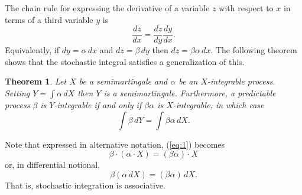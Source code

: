 \documentclass[12pt]{article}
\newtheorem*{theorem*}{Theorem}
\begin{document}

The chain rule for expressing the derivative of a variable $z$ with respect to $x$ in terms of a third variable $y$ is
\begin{equation*}
\frac{dz}{dx}=\frac{dz}{dy}\frac{dy}{dx}.
\end{equation*}
Equivalently, if $dy=\alpha\,dx$ and $dz=\beta\,dy$ then $dz=\beta\alpha\,dx$.
The following theorem shows that the stochastic integral satisfies a generalization of this.

\begin{theorem*}
Let $X$ be a semimartingale and $\alpha$ be an $X$-integrable process. Setting $Y=\int\alpha\,dX$ then $Y$ is a semimartingale. Furthermore, a predictable process $\beta$ is $Y$-integrable if and only if $\beta\alpha$ is $X$-integrable, in which case
\begin{equation}\label{eq:1}
\int\beta\,dY=\int\beta\alpha\,dX.
\end{equation}
\end{theorem*}
Note that expressed in alternative notation, (\ref{eq:1}) becomes
\begin{equation*}
\beta\cdot(\alpha\cdot X)=(\beta\alpha)\cdot X
\end{equation*}
or, in differential notional,
\begin{equation*}
\beta(\alpha\,dX)=(\beta\alpha)\,dX.
\end{equation*}
That is, stochastic integration is associative.

\end{document}
